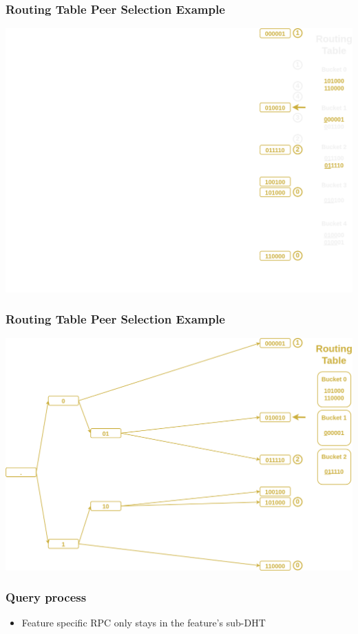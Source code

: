 \documentclass{../pl-slide}
\begin{document}
\begin{frame}
\frametitle{Routing Table Peer Selection Example}
\begin{center}
	\includegraphics[scale=.23]{resources/trie-features-rt.png}
\end{center}
\end{frame}

\begin{frame}
\frametitle{Routing Table Peer Selection Example}
\begin{center}
	\includegraphics[scale=.23]{resources/trie-features-subdht.png}
\end{center}
\end{frame}

\begin{frame}
\frametitle{Query process}
\begin{itemize}
	\itemc In peer lookup, indicate your features priorities
	\itemc Requested peers return in priority peers matching the features priorities
	\itemc Requested peers' routing table is expected to have the same features
	\bigskip
	\item[\greencube] Feature specific RPC only stays in the feature's sub-DHT
\end{itemize}
\end{frame}
\end{document}
